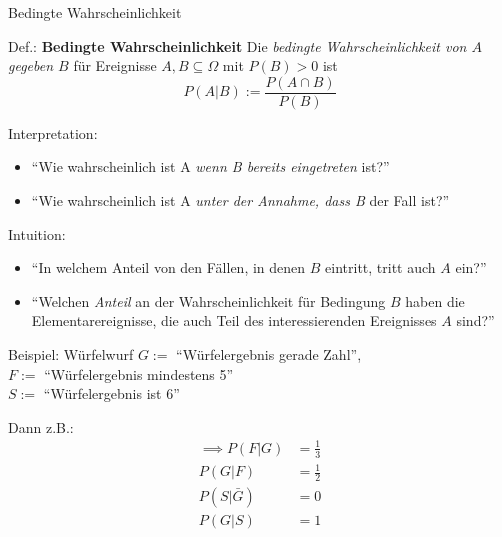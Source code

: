 \documentclass[
  10pt,
  ignorenonframetext,
]{beamer}
\providecommand{\tightlist}{%
  \setlength{\itemsep}{0pt}\setlength{\parskip}{0pt}}
\begin{document}
\begin{frame}{Bedingte Wahrscheinlichkeit}
\label{bedingte-wahrscheinlichkeit}
\begin{block}{Def.: \textbf{Bedingte Wahrscheinlichkeit}}
\label{def.-bedingte-wahrscheinlichkeit}
Die \emph{bedingte Wahrscheinlichkeit von \(A\) gegeben \(B\)} für
Ereignisse \(A, B \subseteq \Omega\) mit \(P(B) > 0\) ist
\[P(A|B) := \frac {P(A \cap B)}{P(B)}\]
\end{block}

Interpretation:

\begin{itemize}
\tightlist
\item
  ``Wie wahrscheinlich ist A \emph{wenn B bereits eingetreten} ist?''
\item
  ``Wie wahrscheinlich ist A \emph{unter der Annahme, dass B} der Fall
  ist?''
\end{itemize}

Intuition:

\begin{itemize}
\tightlist
\item
  ``In welchem Anteil von den Fällen, in denen \(B\) eintritt, tritt
  auch \(A\) ein?''
\item
  ``Welchen \emph{Anteil} an der Wahrscheinlichkeit für Bedingung \(B\)
  haben die Elementarereignisse, die auch Teil des interessierenden
  Ereignisses \(A\) sind?''
\end{itemize}

\end{frame}

\begin{frame}{Beispiel: Würfelwurf}
\label{beispiel-wuxfcrfelwurf}
\(G:=\) ``Würfelergebnis gerade Zahl'',\\
\(F:=\) ``Würfelergebnis mindestens 5''\\
\(S:=\) ``Würfelergebnis ist 6''

Dann z.B.: \begin{align*}
\implies P(F|G) &= \frac{1}{3}\\
 P(G|F) &= \frac{1}{2} \\
 P(S|\bar G) &= 0 \\ 
 P(G|S) &= 1 \\
\end{align*}
\end{frame}
\end{document}
